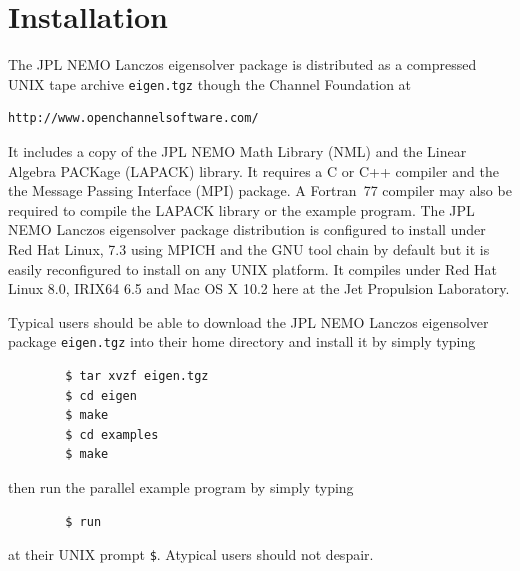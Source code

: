 \documentclass[twoside,12pt]{article}
\begin{document}
\appendix
\section{Installation}
The JPL NEMO Lanczos eigensolver package
is distributed as a compressed UNIX tape archive {\tt eigen.tgz}
though the Channel Foundation at
\begin{verbatim}
http://www.openchannelsoftware.com/
\end{verbatim}
It includes a copy of the JPL NEMO Math Library (NML) and
the Linear Algebra PACKage (LAPACK) library.
It requires a C or C++ compiler
and the the Message Passing Interface (MPI) package.
A Fortran~77 compiler may also be required to compile the LAPACK library
or the example program.
The JPL NEMO Lanczos eigensolver package distribution
is configured to install under Red Hat Linux, 7.3
using MPICH and the GNU tool chain by default
but it is easily reconfigured to install on any UNIX platform.
It compiles under Red Hat Linux 8.0, IRIX64 6.5 and Mac OS X 10.2
here at the Jet Propulsion Laboratory.

Typical users should be able
to download the JPL NEMO Lanczos eigensolver package {\tt eigen.tgz}
into their home directory and install it by simply typing
\begin{verbatim}
        $ tar xvzf eigen.tgz
        $ cd eigen
        $ make
        $ cd examples
        $ make
\end{verbatim}
then run the parallel example program by simply typing
\begin{verbatim}
        $ run
\end{verbatim}
at their UNIX prompt {\tt \$}.
Atypical users should not despair.
\end{document}
